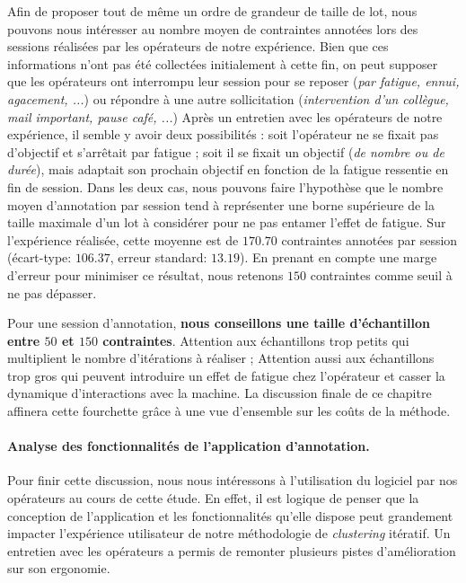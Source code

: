 			Afin de proposer tout de même un ordre de grandeur de taille de lot, nous pouvons nous intéresser au nombre moyen de contraintes annotées lors des sessions réalisées par les opérateurs de notre expérience.
			Bien que ces informations n'ont pas été collectées initialement à cette fin, on peut supposer que les opérateurs ont interrompu leur session pour se reposer (\textit{par fatigue, ennui, agacement, ...}) ou répondre à une autre sollicitation (\textit{intervention d'un collègue, mail important, pause café, ...})
			Après un entretien avec les opérateurs de notre expérience, il semble y avoir deux possibilités : soit l'opérateur ne se fixait pas d'objectif et s'arrêtait par fatigue ; soit il se fixait un objectif (\textit{de nombre ou de durée}), mais adaptait son prochain objectif en fonction de la fatigue ressentie en fin de session.
			Dans les deux cas, nous pouvons faire l'hypothèse que le nombre moyen d'annotation par session tend à représenter une borne supérieure de la taille maximale d'un lot à considérer pour ne pas entamer l'effet de fatigue.
			Sur l'expérience réalisée, cette moyenne est de $170.70$ contraintes annotées par session (écart-type: $106.37$, erreur standard: $13.19$).
			En prenant en compte une marge d'erreur pour minimiser ce résultat, nous retenons $150$ contraintes comme seuil à ne pas dépasser.
			
			\begin{leftBarSummary}
				Pour une session d'annotation, \textbf{nous conseillons une taille d'échantillon entre $50$ et $150$ contraintes}.
				Attention aux échantillons trop petits qui multiplient le nombre d'itérations à réaliser ;
				Attention aussi aux échantillons trop gros qui peuvent introduire un effet de fatigue chez l'opérateur et casser la dynamique d'interactions avec la machine.
				La discussion finale de ce chapitre affinera cette fourchette grâce à une vue d'ensemble sur les coûts de la méthode.
			\end{leftBarSummary}
			

		\paragraph{Analyse des fonctionnalités de l'application d'annotation.}
		
			Pour finir cette discussion, nous nous intéressons à l'utilisation du logiciel par nos opérateurs au cours de cette étude.
			En effet, il est logique de penser que la conception de l'application et les fonctionnalités qu'elle dispose peut grandement impacter l'expérience utilisateur de notre méthodologie de \textit{clustering} itératif.
			Un entretien avec les opérateurs a permis de remonter plusieurs pistes d'amélioration sur son ergonomie.
			
